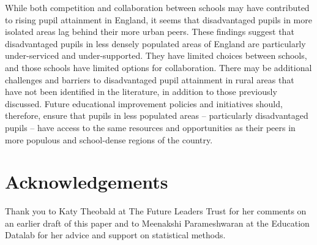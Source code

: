 \documentclass[12pt, a4paper]{article}
\begin{document}
While both competition and collaboration between schools may have contributed to rising pupil attainment in England, it seems that disadvantaged pupils in more isolated areas lag behind their more urban peers. These findings suggest that disadvantaged pupils in less densely populated areas of England are particularly under-serviced and under-supported. They have limited choices between schools, and those schools have limited options for collaboration. There may be additional challenges and barriers to disadvantaged pupil attainment in rural areas that have not been identified in the literature, in addition to those previously discussed. Future educational improvement policies and initiatives should, therefore, ensure that pupils in less populated areas -- particularly disadvantaged pupils -- have access to the same resources and opportunities as their peers in more populous and school-dense regions of the country.

\section*{Acknowledgements}

Thank you to Katy Theobald at The Future Leaders Trust for her comments on an earlier draft of this paper and to Meenakshi Parameshwaran at the Education Datalab for her advice and support on statistical methods.


\printbibliography
\end{document}
